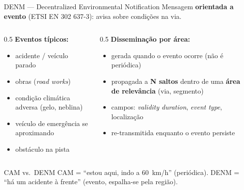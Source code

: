 \documentclass[aspectratio=169,11pt]{beamer}
\begin{document}
\begin{frame}{DENM --- Decentralized Environmental Notification}
  Mensagem \textbf{orientada a evento} (ETSI EN 302 637-3): avisa sobre condições na via.
  \begin{columns}
    \begin{column}{0.5\textwidth}
      \textbf{Eventos típicos:}
      \begin{itemize}
        \item acidente / veículo parado
        \item obras (\emph{road works})
        \item condição climática adversa (gelo, neblina)
        \item veículo de emergência se aproximando
        \item obstáculo na pista
      \end{itemize}
    \end{column}
    \begin{column}{0.5\textwidth}
      \textbf{Disseminação por área:}
      \begin{itemize}
        \item gerada quando o evento ocorre (não é periódica)
        \item propagada a \textbf{N saltos} dentro de uma \textbf{área de relevância} (via, segmento)
        \item campos: \emph{validity duration}, \emph{event type}, localização
        \item re-transmitida enquanto o evento persiste
      \end{itemize}
    \end{column}
  \end{columns}
  \begin{exampleblock}{CAM vs.\ DENM}
    CAM = ``estou aqui, indo a 60~km/h'' (periódica). DENM = ``há um acidente à frente'' (evento, espalha-se pela região).
  \end{exampleblock}
\end{frame}
\end{document}
